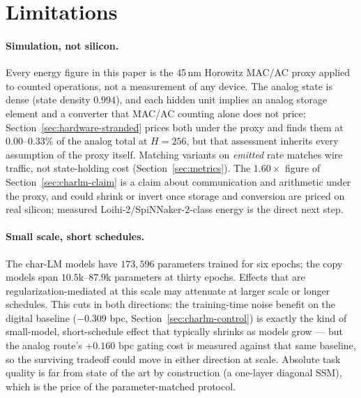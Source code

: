
\section{Limitations}
\label{sec:limitations}

\paragraph{Simulation, not silicon.}
Every energy figure in this paper is the 45\,nm Horowitz MAC/AC proxy applied to counted
operations, not a measurement of any device. The analog state is dense (state density
$0.994$), and each hidden unit implies an analog storage element and a converter that
MAC/AC counting alone does not price; Section~\ref{sec:hardware-stranded} prices both
under the proxy and finds them at $0.00$--$0.33\%$ of the analog total at $H{=}256$, but
that assessment inherits every assumption of the proxy itself. Matching variants on
\emph{emitted} rate matches wire traffic, not
state-holding cost (Section~\ref{sec:metrics}). The $1.60\times$ figure of
Section~\ref{sec:charlm-claim} is a claim about communication and arithmetic under the
proxy, and could shrink or invert once storage and conversion are priced on real silicon;
measured Loihi-2/SpiNNaker-2-class energy is the direct next step.

\paragraph{Small scale, short schedules.}
The char-LM models have $173{,}596$ parameters trained for six epochs; the copy models
span $10.5$k--$87.9$k parameters at thirty epochs. Effects that are
regularization-mediated at this scale may attenuate at larger scale or longer schedules.
This cuts in both directions: the training-time noise benefit on the digital baseline
($-0.309$ bpc, Section~\ref{sec:charlm-control}) is exactly the kind of small-model,
short-schedule effect that typically shrinks as models grow --- but the analog route's
$+0.160$ bpc gating cost is measured against that same baseline, so the surviving
tradeoff could move in either direction at scale. Absolute task quality is far from
state of the art by construction (a one-layer diagonal SSM), which is the price of the
parameter-matched protocol.

